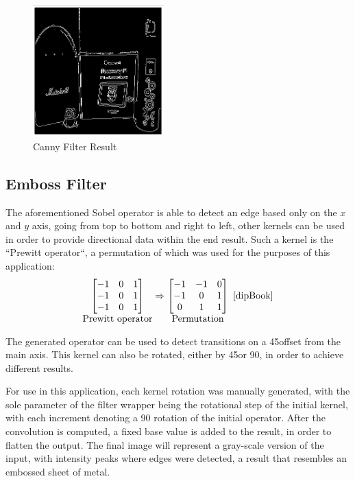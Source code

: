 \begin{figure}[H]
	\includegraphics[width=0.45\textwidth, height=0.45\textwidth]{resources/Canny_2.png}
	\caption{Canny Filter Result}
\end{figure}

\subsection{Emboss Filter}

The aforementioned Sobel operator is able to detect an edge based only on the \(x\) and \(y\) axis, going from
top to bottom and right to left, other kernels can be used in order to provide directional data within the end
result. Such a kernel is the ``Prewitt operator``, a permutation of which was used for the purposes of this
application:
\begin{equation}
	\mathop{
		\begin{bmatrix}
			-1 & 0 & 1 \\
			-1 & 0 & 1 \\
			-1 & 0 & 1 \\
		\end{bmatrix}
	}_{\textstyle \text{Prewitt operator}}
	\Rightarrow
	\mathop{
		\begin{bmatrix}
			-1 & -1 & 0 \\
			-1 & 0  & 1 \\
			0  & 1  & 1 \\
		\end{bmatrix}
	}_{\textstyle \text{Permutation}}
	\text{ \cite{dipBook}}
\end{equation}

The generated operator can be used to detect transitions on a 45\textdegree offset from the main axis. This
kernel can also be rotated, either by 45\textdegree or 90\textdegree, in order to achieve different results.

For use in this application, each kernel rotation was manually generated, with the sole parameter of the
filter wrapper being the rotational step of the initial kernel, with each increment denoting a 90\textdegree
rotation of the initial operator. After the convolution is computed, a fixed base value is added to the
result, in order to flatten the output. The final image will represent a gray-scale version of the input,
with intensity peaks where edges were detected, a result that resembles an embossed sheet of metal.

